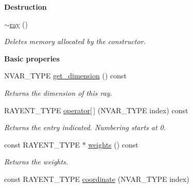 \begin{Indent}\textbf{ Destruction}\par
\begin{DoxyCompactItemize}
\item 
\hyperlink{classray_ae29c6b5cecdc32127dc9e5c0141d120d}{$\sim$ray} ()
\begin{DoxyCompactList}\small\item\em Deletes memory allocated by the constructor. \end{DoxyCompactList}\end{DoxyCompactItemize}
\end{Indent}
\begin{Indent}\textbf{ Basic properies}\par
\begin{DoxyCompactItemize}
\item 
\mbox{\label{classray_a57662d3f86d00384f73869740ec21adf}} 
N\+V\+A\+R\+\_\+\+T\+Y\+PE \hyperlink{classray_a57662d3f86d00384f73869740ec21adf}{get\+\_\+dimension} () const
\begin{DoxyCompactList}\small\item\em Returns the dimension of this ray. \end{DoxyCompactList}\item 
\mbox{\label{classray_a952d271bf4f9361c87864e7479fb8677}} 
R\+A\+Y\+E\+N\+T\+\_\+\+T\+Y\+PE \hyperlink{classray_a952d271bf4f9361c87864e7479fb8677}{operator\mbox{[}$\,$\mbox{]}} (N\+V\+A\+R\+\_\+\+T\+Y\+PE index) const
\begin{DoxyCompactList}\small\item\em Returns the entry indicated. Numbering starts at 0. \end{DoxyCompactList}\item 
\mbox{\label{classray_aaff8d27de2240e43dc0d20f84f953b1b}} 
const R\+A\+Y\+E\+N\+T\+\_\+\+T\+Y\+PE $\ast$ \hyperlink{classray_aaff8d27de2240e43dc0d20f84f953b1b}{weights} () const
\begin{DoxyCompactList}\small\item\em Returns the weights. \end{DoxyCompactList}\item 
\mbox{\label{classray_a785bb4f7649e9c3db1141fdde55834c0}} 
const R\+A\+Y\+E\+N\+T\+\_\+\+T\+Y\+PE \hyperlink{classray_a785bb4f7649e9c3db1141fdde55834c0}{coordinate} (N\+V\+A\+R\+\_\+\+T\+Y\+PE index)

\end{DoxyCompactItemize}
\end{Indent}
